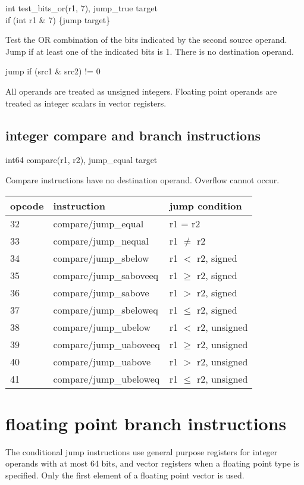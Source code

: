 \documentclass[forwardcom.tex]{subfiles}
\begin{document}
int test\_bits\_or(r1, 7), jump\_true target \\
if (int r1 \& 7) \{jump target\}
\vv

Test the OR combination of the bits indicated by the second source operand. Jump if at least one of the indicated bits is 1. There is no destination operand.
\vv

jump if (src1 \& src2) != 0
\vv

All operands are treated as unsigned integers. 
Floating point operands are treated as integer scalars in vector registers.
\vv


\subsection{integer compare and branch instructions}
int64 compare(r1, r2), jump\_equal target
\vv

Compare instructions have no destination operand. 
Overflow cannot occur.
\vv

\label{table:integerCompareJumpInstructions}
\begin{tabular}{|p{12mm}|p{60mm}|p{50mm}|}
\hline
\bfseries opcode & \bfseries instruction & \bfseries jump condition \\ \hline
32 & compare/jump\_equal & r1 = r2 \\ \hline
33 & compare/jump\_nequal  & r1 $\neq$ r2 \\ \hline
34 & compare/jump\_sbelow & r1 $<$ r2, signed \\ \hline
35 & compare/jump\_saboveeq & r1 $\geq$ r2, signed \\ \hline
36 & compare/jump\_sabove & r1 $>$ r2, signed  \\ \hline
37 & compare/jump\_sbeloweq  & r1 $\leq$ r2, signed \\ \hline
38 & compare/jump\_ubelow & r1 $<$ r2, unsigned \\ \hline
39 & compare/jump\_uaboveeq  & r1 $\geq$ r2, unsigned \\ \hline
40 & compare/jump\_uabove & r1 $>$ r2, unsigned \\ \hline
41 & compare/jump\_ubeloweq  & r1 $\leq$ r2, unsigned \\ \hline
\end{tabular}
\vv


\section{floating point branch instructions}
The conditional jump instructions use general purpose registers for integer operands with at most 64 bits, and vector registers when a floating point type is specified. Only the first element of a floating point vector is used.
\vv
\end{document}
